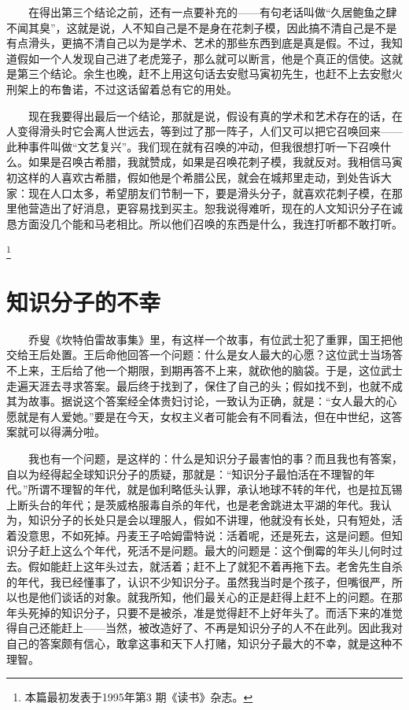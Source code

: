 　　在得出第三个结论之前，还有一点要补充的——有句老话叫做“久居鲍鱼之肆不闻其臭”，这就是说，人不知自己是不是身在花刺子模，因此搞不清自己是不是有点滑头，更搞不清自己以为是学术、艺术的那些东西到底是真是假。不过，我知道假如一个人发现自己进了老虎笼子，那么就可以断言，他是个真正的信使。这就是第三个结论。余生也晚，赶不上用这句话去安慰马寅初先生，也赶不上去安慰火刑架上的布鲁诺，不过这话留着总有它的用处。 

　　现在我要得出最后一个结论，那就是说，假设有真的学术和艺术存在的话，在人变得滑头时它会离人世远去，等到过了那一阵子，人们又可以把它召唤回来—— 此种事件叫做“文艺复兴”。我们现在就有召唤的冲动，但我很想打听一下召唤什么。如果是召唤古希腊，我就赞成，如果是召唤花刺子模，我就反对。我相信马寅初这样的人喜欢古希腊，假如他是个希腊公民，就会在城邦里走动，到处告诉大家：现在人口太多，希望朋友们节制一下，要是滑头分子，就喜欢花刺子模，在那里他营造出了好消息，更容易找到买主。恕我说得难听，现在的人文知识分子在诚恳方面没几个能和马老相比。所以他们召唤的东西是什么，我连打听都不敢打听。

\footnote{本篇最初发表于1995年第3 期《读书》杂志。}

\chapter{知识分子的不幸}

　　乔叟《坎特伯雷故事集》里，有这样一个故事，有位武士犯了重罪，国王把他交给王后处置。王后命他回答一个问题：什么是女人最大的心愿？这位武士当场答不上来，王后给了他一个期限，到期再答不上来，就砍他的脑袋。于是，这位武士走遍天涯去寻求答案。最后终于找到了，保住了自己的头；假如找不到，也就不成其为故事。据说这个答案经全体贵妇讨论，一致认为正确，就是：“女人最大的心愿就是有人爱她。”要是在今天，女权主义者可能会有不同看法，但在中世纪，这答案就可以得满分啦。 

　　我也有一个问题，是这样的：什么是知识分子最害怕的事？而且我也有答案，自以为经得起全球知识分子的质疑，那就是：“知识分子最怕活在不理智的年代。”所谓不理智的年代，就是伽利略低头认罪，承认地球不转的年代，也是拉瓦锡上断头台的年代；是茨威格服毒自杀的年代，也是老舍跳进太平湖的年代。我认为，知识分子的长处只是会以理服人，假如不讲理，他就没有长处，只有短处，活着没意思，不如死掉。丹麦王子哈姆雷特说：活着呢，还是死去，这是问题。但知识分子赶上这么个年代，死活不是问题。最大的问题是：这个倒霉的年头儿何时过去。假如能赶上这年头过去，就活着；赶不上了就犯不着再拖下去。老舍先生自杀的年代，我已经懂事了，认识不少知识分子。虽然我当时是个孩子，但嘴很严，所以也是他们谈话的对象。就我所知，他们最关心的正是赶得上赶不上的问题。在那年头死掉的知识分子，只要不是被杀，准是觉得赶不上好年头了。而活下来的准觉得自己还能赶上——当然，被改造好了、不再是知识分子的人不在此列。因此我对自己的答案颇有信心，敢拿这事和天下人打赌，知识分子最大的不幸，就是这种不理智。 


